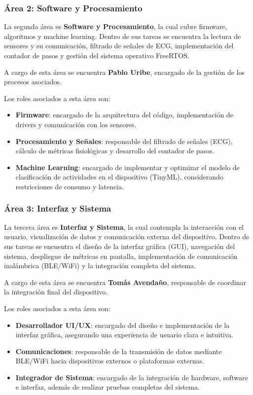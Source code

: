 \documentclass[letterpaper,11pt]{article}
\begin{document}
\subsubsection{Área 2: Software y Procesamiento}

La segunda área es \textbf{Software y Procesamiento}, la cual cubre firmware, algoritmos y machine learning. Dentro de sus tareas se encuentra la lectura de sensores y su comunicación, filtrado de señales de ECG, implementación del contador de pasos y gestión del sistema operativo FreeRTOS.

A cargo de esta área se encuentra \textbf{Pablo Uribe}, encargado de la gestión de los procesos asociados.

Los roles asociados a esta área son:
\begin{itemize}
    \item \textbf{Firmware}: encargado de la arquitectura del código, implementación de drivers y comunicación con los sensores.
    \item \textbf{Procesamiento y Señales}: responsable del filtrado de señales (ECG), cálculo de métricas fisiológicas y desarrollo del contador de pasos.
    \item \textbf{Machine Learning}: encargado de implementar y optimizar el modelo de clasificación de actividades en el dispositivo (TinyML), considerando restricciones de consumo y latencia.
\end{itemize}

\subsubsection{Área 3: Interfaz y Sistema}

La tercera área es \textbf{Interfaz y Sistema}, la cual contempla la interacción con el usuario, visualización de datos y comunicación externa del dispositivo. Dentro de sus tareas se encuentra el diseño de la interfaz gráfica (GUI), navegación del sistema, despliegue de métricas en pantalla, implementación de comunicación inalámbrica (BLE/WiFi) y la integración completa del sistema.

A cargo de esta área se encuentra \textbf{Tomás Avendaño}, responsable de coordinar la integración final del dispositivo.

Los roles asociados a esta área son:
\begin{itemize}
    \item \textbf{Desarrollador UI/UX}: encargado del diseño e implementación de la interfaz gráfica, asegurando una experiencia de usuario clara e intuitiva.
    \item \textbf{Comunicaciones}: responsable de la transmisión de datos mediante BLE/WiFi hacia dispositivos externos o plataformas externas.
    \item \textbf{Integrador de Sistema}: encargado de la integración de hardware, software e interfaz, además de realizar pruebas completas del sistema.
\end{itemize}
\end{document}
